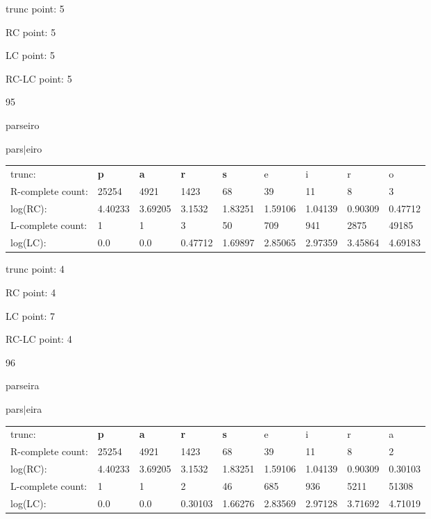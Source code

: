 \documentclass{article}
\begin{document}
trunc point: 5

RC point: 5

LC point: 5

RC-LC point: 5

\vspace{3em}



95

parseiro

pars$|$eiro

\vspace{1em}

\begin{tabular}{l|llllllll}

trunc: & {\color{red}\bf p} & {\color{red}\bf a} & {\color{red}\bf r} & {\color{red}\bf s} & e & i & r & o \\ 
R-complete count: & 25254 & 4921 & 1423 & 68 & 39 & 11 & 8 & 3 \\ 
log(RC): & 4.40233 & 3.69205 & 3.1532 & 1.83251 & 1.59106 & 1.04139 & 0.90309 & 0.47712 \\ 
L-complete count: & 1 & 1 & 3 & 50 & 709 & 941 & 2875 & 49185 \\ 
log(LC): & 0.0 & 0.0 & 0.47712 & 1.69897 & 2.85065 & 2.97359 & 3.45864 & 4.69183 \\ 
\end{tabular}

trunc point: 4

RC point: 4

LC point: 7

RC-LC point: 4

\vspace{3em}



96

parseira

pars$|$eira

\vspace{1em}

\begin{tabular}{l|llllllll}

trunc: & {\color{red}\bf p} & {\color{red}\bf a} & {\color{red}\bf r} & {\color{red}\bf s} & e & i & r & a \\ 
R-complete count: & 25254 & 4921 & 1423 & 68 & 39 & 11 & 8 & 2 \\ 
log(RC): & 4.40233 & 3.69205 & 3.1532 & 1.83251 & 1.59106 & 1.04139 & 0.90309 & 0.30103 \\ 
L-complete count: & 1 & 1 & 2 & 46 & 685 & 936 & 5211 & 51308 \\ 
log(LC): & 0.0 & 0.0 & 0.30103 & 1.66276 & 2.83569 & 2.97128 & 3.71692 & 4.71019 \\ 
\end{tabular}
\end{document}
